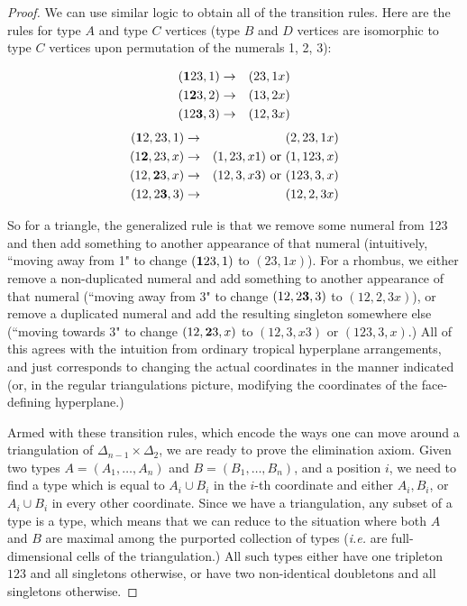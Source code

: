 \documentclass[11pt]{amsart}
\begin{document}
\begin{proof}
We can use similar logic to obtain all of the transition rules. %
Here are the rules for type $A$ and type $C$ vertices (type $B$ and $D$ vertices are 
isomorphic to type $C$ vertices upon permutation of the numerals 1, 2, 3):

\begin{eqnarray*}
({\bf 1}23, 1) & \rightarrow & (23, 1x) \\
(1{\bf 2}3, 2) & \rightarrow & (13, 2x) \\
(12{\bf 3}, 3) & \rightarrow & (12, 3x) \\
\end{eqnarray*}
\begin{eqnarray*}
({\bf 1}2, 23, 1) & \rightarrow & (2, 23, 1x) \\
(1{\bf 2}, 23, x) & \rightarrow & (1, 23, x1) \textrm{ or } (1, 123, x)\\
(12, {\bf 2}3, x) & \rightarrow & (12, 3, x3) \textrm{ or } (123, 3, x)\\
(12, 2{\bf 3}, 3) & \rightarrow & (12, 2, 3x) \\
\end{eqnarray*}

So for a triangle, the generalized rule is that 
we remove some numeral from 123 and then add something to another appearance of that numeral (intuitively, ``moving away from 1" to change 
$({\bf 1}23, 1)$ to $(23, 1x)$). For a rhombus, we either remove a non-duplicated numeral and add something to another appearance of that numeral (``moving 
away from 3" to change $(12, 2{\bf 3}, 3)$ to $(12, 2, 3x)$), or remove a duplicated numeral and add the resulting singleton somewhere else (``moving 
towards 3" to change $(12, {\bf 2}3, x)$ to $(12, 3, x3)$ or $(123, 3, x)$.) All of this agrees with the intuition from ordinary tropical hyperplane 
arrangements, and just corresponds to changing the actual coordinates in the manner indicated (or, in the regular triangulations picture, modifying 
the coordinates of the face-defining hyperplane.) 

\medskip


Armed with these transition rules, which encode the ways one can move around a triangulation of $\Delta_{n-1} \times \Delta_2$, we are ready to prove the elimination axiom. 
Given two types $A = (A_1, \ldots, A_n)$ and $B = (B_1, \ldots, B_n)$, and a position $i$, we need to 
find a type which is equal to $A_i\cup B_i$ in the $i$-th coordinate and either $A_i, B_i$, or $A_i\cup B_i$ in every other coordinate. Since we 
have a triangulation, any subset of a type is a type, which means that we can reduce to the situation where both $A$ and $B$ are maximal among the 
purported collection of types (\emph{i.e.} are full-dimensional cells of the triangulation.) All such types either have one tripleton $123$ and all 
singletons otherwise, or have two non-identical doubletons and all singletons otherwise.


\end{proof}
\end{document}
